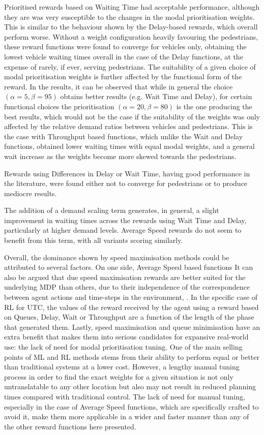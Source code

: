 \documentclass[conference]{IEEEtran}
\begin{document}
Prioritised rewards based on Waiting Time had acceptable performance, although they are was very susceptible to the changes in the modal prioritisation weights. 
This is similar to the behaviour shown by the Delay-based rewards, which overall perform worse.
Without a weight configuration heavily favouring the pedestrians, these reward functions were found to converge for vehicles only, obtaining the lowest vehicle waiting times overall in the case of the Delay functions, at the expense of rarely, if ever, serving pedestrians.
The suitability of a given choice of modal prioritisation weights is further affected by the functional form of the reward.
In the results, it can be observed that while in general the choice $(\alpha=5,\beta=95)$ obtains better results (e.g. Wait Time and Delay), for certain functional choices the prioritisation $(\alpha=20,\beta=80)$ is the one producing the best results, which would not be the case if the suitability of the weights was only affected by the relative demand ratios between vehicles and pedestrians. 
This is the case with Throughput based functions, which unlike the Wait and Delay functions, obtained lower waiting times with equal modal weights, and a general wait increase as the weights become more skewed towards the pedestrians.

Rewards using Differences in Delay or Wait Time, having good performance in the literature, were found either not to converge for pedestrians or to produce mediocre results.

The addition of a demand scaling term generates, in general, a slight improvement in waiting times across the rewards using Wait Time and Delay, particularly at higher demand levels. 
Average Speed rewards do not seem to benefit from this term, with all variants scoring similarly.

Overall, the dominance shown by speed maximisation methods could be attributed to several factors.
On one side, Average Speed based functions 
It can also be argued that due speed maximisation rewards are better suited for the underlying MDP than others, due to their independence of the correspondence between agent actions and time-steps in the environment, . In the specific case of RL for UTC, the values of the reward received by the agent using a reward based on Queues, Delay, Wait or Throughput are a function of the length of the phase that generated them.
Lastly, speed maximisation and queue minimisation have an extra benefit that makes them into serious candidates for expansive real-world use: the lack of need for modal prioritisation tuning.
One of the main selling points of ML and RL methods stems from their ability to perform equal or better than traditional systems at a lower cost.
However, a lengthy manual tuning process in order to find the exact weights for a given situation is not only untranslatable to any other location but also may not result in reduced planning times compared with traditional control.
The lack of need for manual tuning, especially in the case of Average Speed functions, which are specifically crafted to avoid it, make them more applicable in a wider and faster manner than any of the other reward functions here presented.
\end{document}

